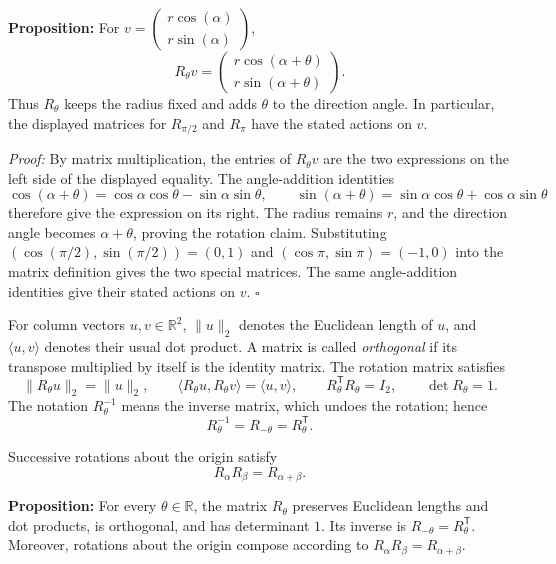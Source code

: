 \documentclass[a4paper,11pt,abstract=true]{scrartcl}
\theoremstyle{dotlessP}
\theoremstyle{dotlessS}
\theoremstyle{remark}
\theoremstyle{definition}
\begin{document}
\begin{problem_box}
\textbf{Proposition:}
For $v=\begin{pmatrix}r\cos(\alpha)\\r\sin(\alpha)\end{pmatrix}$,
\[
R_{\theta}v=
\begin{pmatrix}r\cos(\alpha+\theta)\\r\sin(\alpha+\theta)\end{pmatrix}.
\]
Thus $R_{\theta}$ keeps the radius fixed and adds $\theta$ to the
direction angle. In particular, the displayed matrices for
$R_{\pi/2}$ and $R_{\pi}$ have the stated actions on $v$.
\end{problem_box}

\begin{claim_box}
\textit{Proof:} By matrix multiplication, the entries of $R_{\theta}v$
are the two expressions on the left side of the displayed equality.
The angle-addition identities
\[
\cos(\alpha+\theta)=\cos\alpha\cos\theta-\sin\alpha\sin\theta,
\qquad
\sin(\alpha+\theta)=\sin\alpha\cos\theta+\cos\alpha\sin\theta
\]
therefore give the expression on its right. The radius remains $r$,
and the direction angle becomes $\alpha+\theta$, proving the rotation
claim. Substituting $(\cos(\pi/2),\sin(\pi/2))=(0,1)$ and
$(\cos\pi,\sin\pi)=(-1,0)$ into the matrix definition gives the two
special matrices. The same angle-addition identities give their stated
actions on $v$. \hfill$\square$
\end{claim_box}

For column vectors $u,v\in\mathbb{R}^2$, $\|u\|_2$ denotes the
Euclidean length of $u$, and $\langle u,v\rangle$ denotes their usual
dot product. A matrix is called \emph{orthogonal} if its transpose
multiplied by itself is the identity matrix. The rotation matrix satisfies
\[
\|R_{\theta}u\|_2=\|u\|_2,
\qquad
\langle R_{\theta}u,R_{\theta}v\rangle=\langle u,v\rangle,
\qquad
R_{\theta}^{\mathsf{T}}R_{\theta}=I_2,
\qquad \det R_{\theta}=1.
\]
The notation $R_{\theta}^{-1}$ means the inverse matrix, which undoes
the rotation; hence
\[
R_{\theta}^{-1}=R_{-\theta}=R_{\theta}^{\mathsf{T}}.
\]

Successive rotations about the origin satisfy
\[
R_{\alpha}R_{\beta}=R_{\alpha+\beta}.
\]

\begin{problem_box}
\textbf{Proposition:}
For every $\theta\in\mathbb{R}$, the matrix $R_{\theta}$ preserves
Euclidean lengths and dot products, is orthogonal, and has determinant
$1$. Its inverse is $R_{-\theta}=R_{\theta}^{\mathsf{T}}$. Moreover,
rotations about the origin compose according to
$R_{\alpha}R_{\beta}=R_{\alpha+\beta}$.
\end{problem_box}
\end{document}
